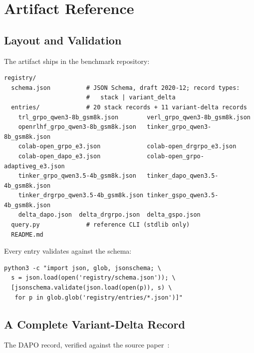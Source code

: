 \section{Artifact Reference}
\label{sec:p6-appendix}

\subsection{Layout and Validation}
\label{sec:p6-appendix-layout}
The artifact ships in the benchmark repository:

\begin{lstlisting}[basicstyle=\ttfamily\scriptsize, frame=single,
  caption={Artifact layout.}, label={lst:p6-layout}]
registry/
  schema.json          # JSON Schema, draft 2020-12; record types:
                       #   stack | variant_delta
  entries/             # 20 stack records + 11 variant-delta records
    trl_grpo_qwen3-8b_gsm8k.json        verl_grpo_qwen3-8b_gsm8k.json
    openrlhf_grpo_qwen3-8b_gsm8k.json   tinker_grpo_qwen3-8b_gsm8k.json
    colab-open_grpo_e3.json             colab-open_drgrpo_e3.json
    colab-open_dapo_e3.json             colab-open_grpo-adaptiveg_e3.json
    tinker_grpo_qwen3.5-4b_gsm8k.json   tinker_dapo_qwen3.5-4b_gsm8k.json
    tinker_drgrpo_qwen3.5-4b_gsm8k.json tinker_gspo_qwen3.5-4b_gsm8k.json
    delta_dapo.json  delta_drgrpo.json  delta_gspo.json
  query.py             # reference CLI (stdlib only)
  README.md
\end{lstlisting}

Every entry validates against the schema:

\begin{lstlisting}[basicstyle=\ttfamily\scriptsize, frame=single]
python3 -c "import json, glob, jsonschema; \
  s = json.load(open('registry/schema.json')); \
  [jsonschema.validate(json.load(open(p)), s) \
   for p in glob.glob('registry/entries/*.json')]"
\end{lstlisting}

\subsection{A Complete Variant-Delta Record}
\label{sec:p6-appendix-delta}
The DAPO record, verified against the source paper~\citep{yu2025dapo}:


